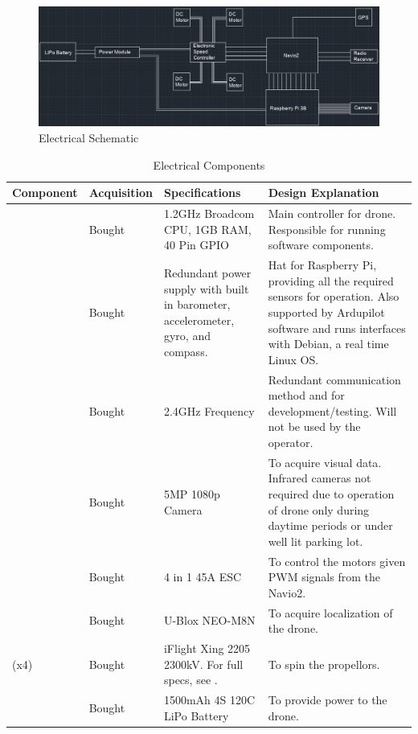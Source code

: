 \documentclass[12pt, titlepage]{article}
\begin{document}
\begin{figure}[h!]
  \begin{center} 
  \caption{Electrical Schematic}
  \label{elecSchematic}
        \includegraphics[width=1\textwidth]{ElectricalSchematic.PNG}
  \end{center}
\end{figure}

\begin{table}[!h]
\begin{center}
\caption {Electrical Components}
\label{tab:elecComponents}
\begin{tabular}{ | m{2.7cm} | m{1.9cm} | m{4cm} | m{6.4cm} | } 
\hline
Component & Acquisition & Specifications & Design Explanation \\
\hline
\nameref{Raspberry Pi 3B} & Bought & 1.2GHz Broadcom CPU, 1GB RAM, 40 Pin GPIO & 
    Main controller for drone. Responsible for running software components. \\
\hline
\nameref{Navio2} & Bought & Redundant power supply with built in barometer, accelerometer, gyro, and compass. & 
    Hat for Raspberry Pi, providing all the required sensors for operation. Also supported by Ardupilot software and runs interfaces with Debian, a real time Linux OS. \\
\hline
\nameref{Radio Antenna and Receiver} & Bought & 2.4GHz Frequency & 
    Redundant communication method and for development/testing. Will not be used by the operator. \\
\hline
\nameref{Camera} & Bought & 5MP 1080p Camera & 
    To acquire visual data. Infrared cameras not required due to operation of drone only during daytime periods or under well lit parking lot. \\
\hline
\nameref{Electronic Speed Controller} & Bought & 4 in 1 45A ESC & 
    To control the motors given PWM signals from the Navio2. \\
\hline
\nameref{GPS} & Bought & U-Blox NEO-M8N & 
    To acquire localization of the drone. \\
\hline
\nameref{Brushless DC Motor} (x4) & Bought & iFlight Xing 2205 2300kV. For full specs, see \nameref{motorSpecs}. & 
    To spin the propellors. \\
\hline
\nameref{LiPo Battery} & Bought & 1500mAh 4S 120C LiPo Battery & 
    To provide power to the drone. \\
\hline
\end{tabular}
\end{center}
\end{table}
\end{document}
